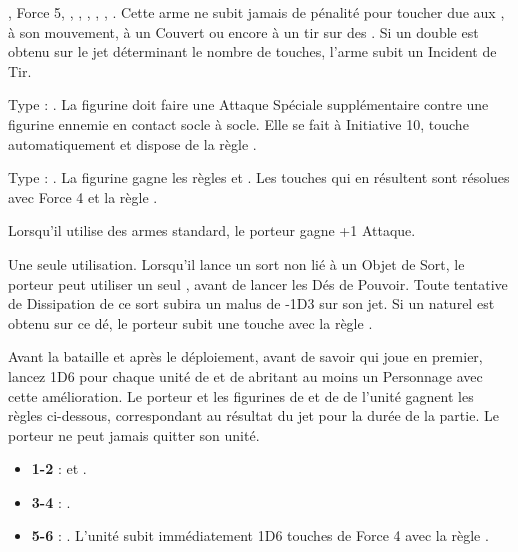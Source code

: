 \begin{multicols}{2}
\nopricelistitem{\naphthathrower} , Force 5,  \flamingattacks{}, \magicalattacks{}, , \volatile{}, \reload{}, .\vspace*{3pt}\newline
Cette arme ne subit jamais de pénalité pour toucher due aux \multipleshots{}, à son mouvement, à un Couvert ou encore à un tir sur des \skirmishers{}. Si un double est obtenu sur le jet déterminant le nombre de touches, l'arme subit un Incident de Tir.

\endpricelist

\subtitle{Armes de Corps à Corps}

\startpricelist

\nopricelistitem{\plagueflail} Type : \flail{}. La figurine doit faire une Attaque Spéciale supplémentaire contre une figurine ennemie en contact socle à socle. Elle se fait à Initiative 10, touche automatiquement et dispose de la règle \toxicattacks{}.

\nopricelistitem{\meatgrinder} Type : \hw{}. La figurine gagne les règles  et . Les touches qui en résultent sont résolues avec Force 4 et la règle .

\endpricelist

\subtitle{Autres Équipements}

\startpricelist

\nopricelistitem{\tailweapon} Lorsqu'il utilise des armes standard, le porteur gagne +1 Attaque.

\nopricelistitem{\darkshard} Une seule utilisation. Lorsqu'il lance un sort non lié à un Objet de Sort, le porteur peut utiliser un seul \darkshard{}, avant de lancer les Dés de Pouvoir. Toute tentative de Dissipation de ce sort subira un malus de -1D3 sur son jet. Si un  naturel est obtenu sur ce dé, le porteur subit une touche avec la règle \toxicattacks{}.

\nopricelistitem{\darkshardbrew} Avant la bataille et après le déploiement, avant de savoir qui joue en premier, lancez 1D6 pour chaque unité de \ratsatarms{} et de \verminguard{} abritant au moins un Personnage avec cette amélioration. Le porteur et les figurines de \ratsatarms{} et de \verminguard{} de l'unité gagnent les règles ci-dessous, correspondant au résultat du jet pour la durée de la partie. Le porteur ne peut jamais quitter son unité.
\begin{itemize}[label={-}]
\item \textbf{1-2} : \poisonedattacks{} et \stupidity{}.
\item \textbf{3-4} : \thunderouscharge{}.
\item \textbf{5-6} : \lightningreflexes{}. L'unité subit immédiatement 1D6 touches de Force 4 avec la règle .
\end{itemize}

\endpricelist

\end{multicols}

